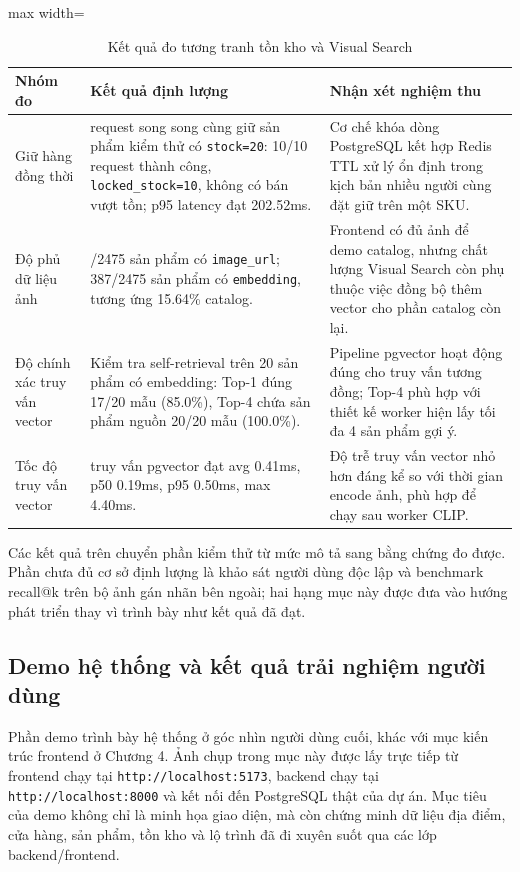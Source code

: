 \documentclass[12pt, a4paper]{article}
\begin{document}
\begin{table}[H]
\centering
\renewcommand{\arraystretch}{1.25}
\small
\begin{adjustbox}{max width=\textwidth}
\begin{tabular}{|>{\raggedright\arraybackslash}p{3.0cm}|>{\raggedright\arraybackslash}p{5.4cm}|>{\raggedright\arraybackslash}p{6.3cm}|}
\hline
\textbf{Nhóm đo} & \textbf{Kết quả định lượng} & \textbf{Nhận xét nghiệm thu} \\ \hline
Giữ hàng đồng thời & 10 request song song cùng giữ sản phẩm kiểm thử có \texttt{stock=20}: 10/10 request thành công, \texttt{locked\_stock=10}, không có bán vượt tồn; p95 latency đạt 202.52ms. & Cơ chế khóa dòng PostgreSQL kết hợp Redis TTL xử lý ổn định trong kịch bản nhiều người cùng đặt giữ trên một SKU. \\ \hline
Độ phủ dữ liệu ảnh & 2460/2475 sản phẩm có \texttt{image\_url}; 387/2475 sản phẩm có \texttt{embedding}, tương ứng 15.64\% catalog. & Frontend có đủ ảnh để demo catalog, nhưng chất lượng Visual Search còn phụ thuộc việc đồng bộ thêm vector cho phần catalog còn lại. \\ \hline
Độ chính xác truy vấn vector & Kiểm tra self-retrieval trên 20 sản phẩm có embedding: Top-1 đúng 17/20 mẫu (85.0\%), Top-4 chứa sản phẩm nguồn 20/20 mẫu (100.0\%). & Pipeline pgvector hoạt động đúng cho truy vấn tương đồng; Top-4 phù hợp với thiết kế worker hiện lấy tối đa 4 sản phẩm gợi ý. \\ \hline
Tốc độ truy vấn vector & 20 truy vấn pgvector đạt avg 0.41ms, p50 0.19ms, p95 0.50ms, max 4.40ms. & Độ trễ truy vấn vector nhỏ hơn đáng kể so với thời gian encode ảnh, phù hợp để chạy sau worker CLIP. \\ \hline
\end{tabular}
\end{adjustbox}
\caption{Kết quả đo tương tranh tồn kho và Visual Search}
\label{tab:load_vision_metrics}
\end{table}

Các kết quả trên chuyển phần kiểm thử từ mức mô tả sang bằng chứng đo được. Phần chưa đủ cơ sở định lượng là khảo sát người dùng độc lập và benchmark recall@k trên bộ ảnh gán nhãn bên ngoài; hai hạng mục này được đưa vào hướng phát triển thay vì trình bày như kết quả đã đạt.
\subsection{Demo hệ thống và kết quả trải nghiệm người dùng}
Phần demo trình bày hệ thống ở góc nhìn người dùng cuối, khác với mục kiến trúc frontend ở Chương 4. Ảnh chụp trong mục này được lấy trực tiếp từ frontend chạy tại \texttt{http://localhost:5173}, backend chạy tại \texttt{http://localhost:8000} và kết nối đến PostgreSQL thật của dự án. Mục tiêu của demo không chỉ là minh họa giao diện, mà còn chứng minh dữ liệu địa điểm, cửa hàng, sản phẩm, tồn kho và lộ trình đã đi xuyên suốt qua các lớp backend/frontend.
\end{document}
